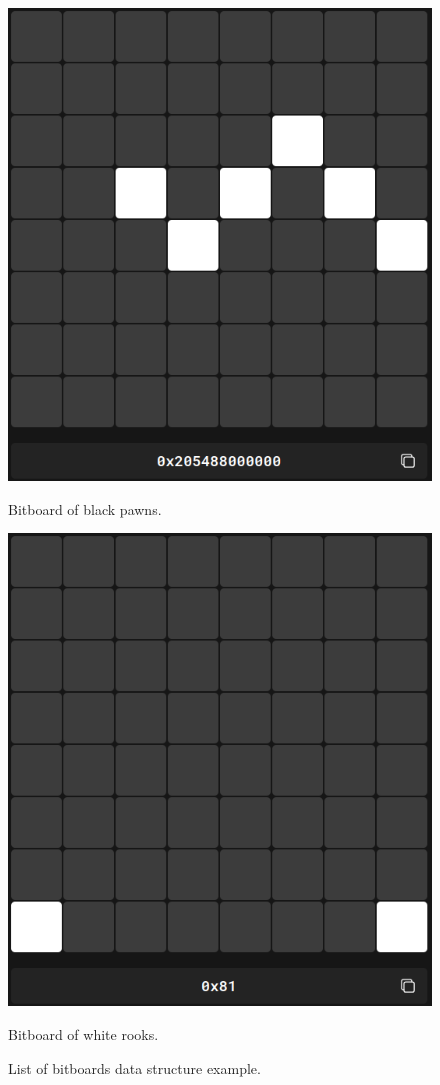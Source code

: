 \begin{figure}
\begin{minipage}[c]{0.30\textwidth}
        \includegraphics[width=\textwidth]{Imagenes/bitboard_black_pawns.png}
        \caption*{Bitboard of black pawns.}
    \end{minipage}
    \hfill
    \begin{minipage}[c]{0.30\textwidth}
        \includegraphics[width=\textwidth]{Imagenes/bitboard_white_rooks.png}
        \caption*{Bitboard of white rooks.}
    \end{minipage}
    \caption{List of bitboards data structure example.}\label{fig:bitboardPositionExample}
\end{figure}

